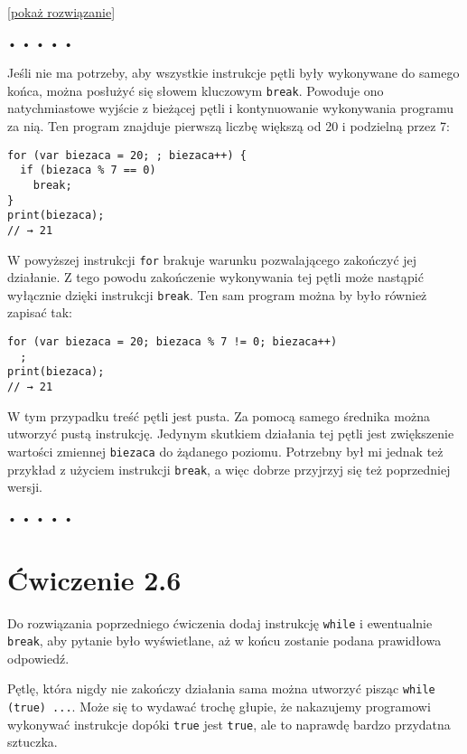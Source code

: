     
[\hyperref[sol:2.5]{pokaż rozwiązanie}]
    
    
  
  \begin{center}
• • • • •
\end{center}
  
    
Jeśli nie ma potrzeby, aby wszystkie instrukcje pętli były wykonywane do samego końca, można posłużyć się słowem kluczowym \texttt{break}. Powoduje ono natychmiastowe wyjście z bieżącej pętli i kontynuowanie wykonywania programu za nią. Ten program znajduje pierwszą liczbę większą od 20 i podzielną przez 7:

\begin{verbatim} 
for (var biezaca = 20; ; biezaca++) {
  if (biezaca % 7 == 0)
    break;
}
print(biezaca);
// → 21
\end{verbatim}
    
W powyższej instrukcji \texttt{for} brakuje warunku pozwalającego zakończyć jej działanie. Z tego powodu zakończenie wykonywania tej pętli może nastąpić wyłącznie dzięki instrukcji \texttt{break}. Ten sam program można by było również zapisać tak:

\begin{verbatim} 
for (var biezaca = 20; biezaca % 7 != 0; biezaca++)
  ;
print(biezaca);
// → 21
\end{verbatim}
    
W tym przypadku treść pętli jest pusta. Za pomocą samego średnika można utworzyć pustą instrukcję. Jedynym skutkiem działania tej pętli jest zwiększenie wartości zmiennej \texttt{biezaca} do żądanego poziomu. Potrzebny był mi jednak też przykład z użyciem instrukcji \texttt{break}, a więc dobrze przyjrzyj się też poprzedniej wersji.

  
\begin{center}
• • • • •
\end{center}
  
\section*{Ćwiczenie 2.6}
\label{sec:2.6}
    
      
Do rozwiązania poprzedniego ćwiczenia dodaj instrukcję \texttt{while} i ewentualnie \texttt{break}, aby pytanie było wyświetlane, aż w końcu zostanie podana prawidłowa odpowiedź.

      
Pętlę, która nigdy nie zakończy działania sama można utworzyć pisząc \texttt{while (true) ...}. Może się to wydawać trochę głupie, że nakazujemy programowi wykonywać instrukcje dopóki \texttt{true} jest \texttt{true}, ale to naprawdę bardzo przydatna sztuczka.

